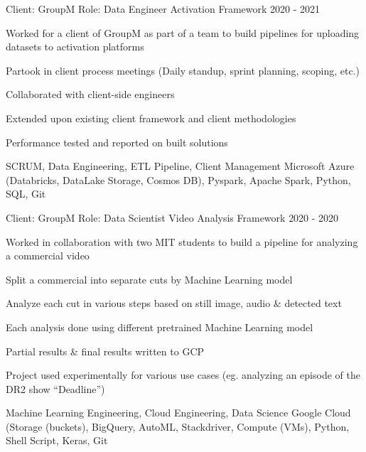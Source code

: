 \begin{cventries}
\cventry
{Client: GroupM \newline Role: Data Engineer} %
{Activation Framework} %
{}%
{2020 - 2021} %
{ %
\begin{cvitems}
    \item {Worked for a client of GroupM as part of a team to build pipelines for uploading datasets to activation platforms}
    \item {Partook in client process meetings (Daily standup, sprint planning, scoping, etc.)}
    \item {Collaborated with client-side engineers}
    \item {Extended upon existing client framework and client methodologies}
    \item {Performance tested and reported on built solutions}
\end{cvitems}
\cventrykeywords
{SCRUM, Data Engineering, ETL Pipeline, Client Management}
{Microsoft Azure (Databricks, DataLake Storage, Cosmos DB), Pyspark, Apache Spark, Python, SQL, Git}
}

\cventry
{Client: GroupM \newline Role: Data Scientist} %
{Video Analysis Framework} %
{}%
{2020 - 2020} %
{ %
\begin{cvitems}
    \item {Worked in collaboration with two MIT students to build a pipeline for analyzing a commercial video}
    \item {Split a commercial into separate cuts by Machine Learning model}
    \item {Analyze each cut in various steps based on still image, audio \& detected text}
    \item {Each analysis done using different pretrained Machine Learning model}
    \item {Partial results \& final results written to GCP}
    \item {Project used experimentally for various use cases (eg. analyzing an episode of the DR2 show “Deadline”)}
\end{cvitems}
\cventrykeywords
{Machine Learning Engineering, Cloud Engineering, Data Science}
{Google Cloud (Storage (buckets), BigQuery, AutoML, Stackdriver, Compute (VMs), Python, Shell Script, Keras, Git}
}


\end{cventries}
